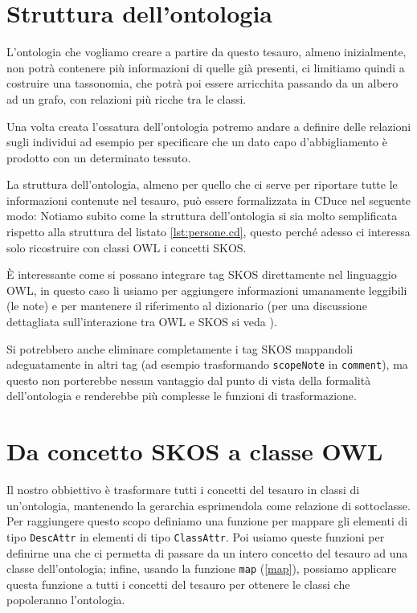 \section{Struttura dell'ontologia}
L'ontologia che vogliamo creare a partire da questo tesauro, almeno inizialmente, non potrà contenere più informazioni di quelle già presenti, ci limitiamo quindi a costruire una tassonomia, che potrà poi essere arricchita passando da un albero ad un grafo, con relazioni più ricche tra le classi. 

Una volta creata l'ossatura dell'ontologia potremo andare a definire delle relazioni sugli individui ad esempio per specificare che un dato capo d'abbigliamento è prodotto con un determinato tessuto.

La struttura dell'ontologia, almeno per quello che ci serve per riportare tutte le informazioni contenute nel tesauro, può essere formalizzata in CDuce nel seguente modo:
Notiamo subito come la struttura dell'ontologia si sia molto semplificata rispetto alla struttura del listato \ref{lst:persone.cd}, questo perché adesso ci interessa solo ricostruire con classi OWL i concetti SKOS.

È interessante come si possano integrare tag SKOS direttamente nel linguaggio OWL, in questo caso li usiamo per aggiungere informazioni umanamente leggibili (le note) e per mantenere il riferimento al dizionario (per una discussione dettagliata sull'interazione tra OWL e SKOS si veda \cite{OWL&SKOS}).

Si potrebbero anche eliminare completamente i tag SKOS mappandoli adeguatamente in altri tag (ad esempio trasformando \verb|scopeNote| in \verb|comment|), ma questo non porterebbe nessun vantaggio dal punto di vista della formalità dell'ontologia e renderebbe più complesse le funzioni di trasformazione.

\section{Da concetto SKOS a classe OWL}
Il nostro obbiettivo è trasformare tutti i concetti del tesauro in classi di un'ontologia, mantenendo la gerarchia esprimendola come relazione di sottoclasse. Per raggiungere questo scopo definiamo una funzione per mappare gli elementi di tipo \verb|DescAttr| in elementi di tipo \verb|ClassAttr|. Poi usiamo queste funzioni per definirne una che ci permetta di passare da un intero concetto del tesauro ad una classe dell'ontologia; infine, usando la funzione \verb|map| (\ref{map}), possiamo applicare questa funzione a tutti i concetti del tesauro per ottenere le classi che popoleranno l'ontologia.
